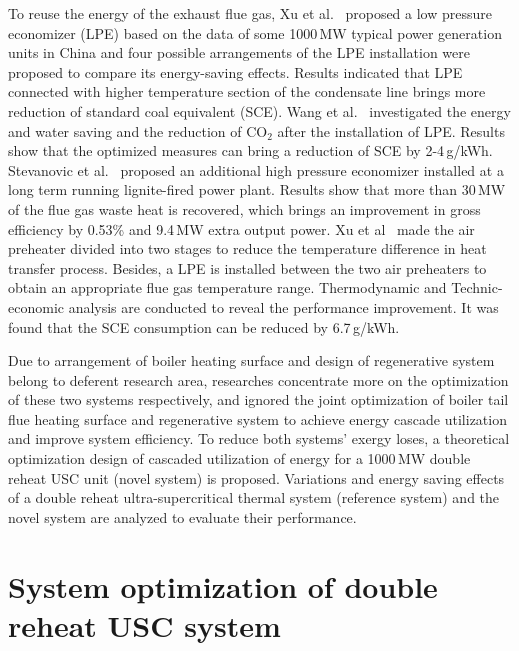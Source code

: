 \documentclass[preprint,12pt]{elsarticle}
\begin{document}
To reuse the energy of the exhaust flue gas, Xu et al.~\cite{Xu2013Techno} proposed a low pressure economizer (LPE) based on the data of some 1000\,MW typical power generation units in China and four possible arrangements of the LPE installation were proposed to compare its energy-saving effects.
Results indicated that LPE connected with higher temperature section of the condensate line brings more reduction of standard coal equivalent (SCE).
Wang et al.~\cite{Wang2012Application} investigated the energy and water saving and the reduction of CO$_2$ after the installation of LPE.
Results show that the optimized measures can bring a reduction of SCE by 2-4\,g/kWh.
Stevanovic et al.~\cite{Stevanovic2014Efficiency} proposed an additional high pressure economizer installed at a long term running lignite-fired power plant.
Results show that more than 30\,MW of the flue gas waste heat is recovered, which brings an improvement in gross efficiency by 0.53\% and 9.4\,MW extra output power.
Xu et al~\cite{Xu2013A} made the air preheater divided into two stages to reduce the temperature difference in heat transfer process.
Besides, a LPE is installed between the two air preheaters to obtain an appropriate flue gas temperature range.
Thermodynamic and Technic-economic analysis are conducted to reveal the performance improvement.
It was found that the SCE consumption can be reduced by 6.7\,g/kWh. 

Due to arrangement of boiler heating surface and design of regenerative system belong to deferent research area, researches concentrate more on the optimization of these two systems respectively, and ignored the joint optimization of boiler tail flue heating surface and regenerative system to achieve energy cascade utilization and improve system efficiency.
To reduce both systems' exergy loses, a theoretical optimization design of cascaded utilization of energy for a 1000\,MW double reheat USC unit (novel system) is proposed. Variations and energy saving effects of a double reheat ultra-supercritical thermal system (reference system) and the novel system are analyzed to evaluate their performance. 
\section{System optimization of double reheat USC system}
\label{sec2:system intro}
\end{document}
